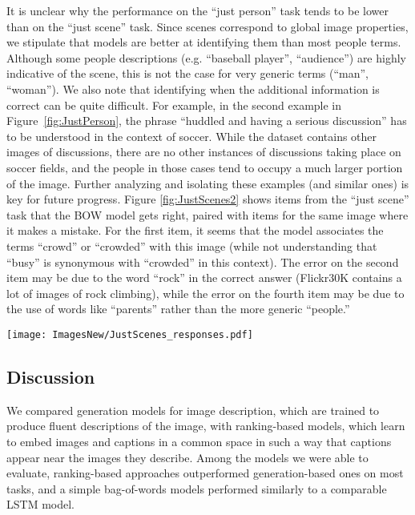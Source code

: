 \documentclass[11pt]{article}
\begin{document}
It is unclear why the performance on the ``just person'' task tends to be lower than on the ``just scene'' task. Since scenes correspond to global image properties, we stipulate that models are better at identifying them than most people terms. Although some people descriptions (e.g. ``baseball player'', ``audience'') are highly indicative of the scene, this is not the case for very generic terms (``man'', ``woman''). We also note that identifying when the additional information is correct can be quite difficult. For example, in the second example in Figure~\ref{fig:JustPerson}, the phrase ``huddled and having a serious discussion'' has to be understood in the context of soccer. While the dataset contains other images of  discussions, there are no other instances of discussions taking place on soccer fields, and the people in those cases tend to occupy a much larger portion of the image.  Further analyzing and isolating these examples (and similar ones) is key for future progress. 
Figure \ref{fig:JustScenes2} shows items from the ``just scene'' task that the BOW model gets right, paired with items for the same image where it makes a mistake. For the first item, it seems that the model associates the terms  ``crowd'' or ``crowded'' with this image (while not understanding that ``busy'' is synonymous with ``crowded'' in this context).  The error on the second item may be due to the word ``rock'' in the correct answer (Flickr30K contains a lot of images of rock climbing), while the error on the fourth item may be due to the use of words like ``parents''  rather than the more generic ``people.''


\begin{figure*}[!h]
\centering \texttt{[image: ImagesNew/JustScenes\_responses.pdf]} 
\caption{Items from the ``Just Scene''  task 
  with the scores from the BOW ranking model in parentheses (bold = the caption preferred by the model).}%
\label{fig:JustScenes2} 
\end{figure*}


\subsection{Discussion}
We compared generation models for image description, which are trained to produce fluent descriptions of the image, with ranking-based models, which learn to embed images and captions in a common space in such a way that captions appear near the images they describe. 
Among the models we were able to evaluate, ranking-based approaches outperformed generation-based ones on most tasks, and a simple bag-of-words models performed similarly to a comparable LSTM model. 
\end{document}
